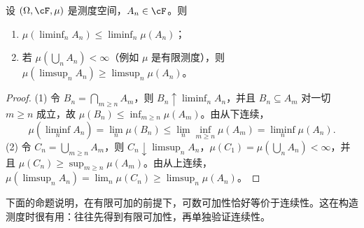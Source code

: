 \begin{proposition}\label{prop:measures:fatou-sets}
设 $(\Omega,\cF,\mu)$ 是测度空间，$A_n\in\cF$。则
\begin{enumerate}
\item $\mu(\liminf_nA_n)\leqslant\liminf_n\mu(A_n)$；
\item 若 $\mu(\bigcup_nA_n)<\infty$（例如 $\mu$ 是有限测度），则 $\mu(\limsup_nA_n)\geqslant\limsup_n\mu(A_n)$。
\end{enumerate}
\end{proposition}
\begin{proof}
(1) 令 $B_n=\bigcap_{m\geqslant n}A_m$，则 $B_n\uparrow\liminf_nA_n$，并且 $B_n\subseteq A_m$ 对一切 $m\geqslant n$ 成立，故 $\mu(B_n)\leqslant\inf_{m\geqslant n}\mu(A_m)$。由从下连续，
\[
\mu(\liminf_nA_n)=\lim_n\mu(B_n)\leqslant\lim_n\inf_{m\geqslant n}\mu(A_m)=\liminf_n\mu(A_n).
\]
(2) 令 $C_n=\bigcup_{m\geqslant n}A_m$，则 $C_n\downarrow\limsup_nA_n$，$\mu(C_1)=\mu(\bigcup_nA_n)<\infty$，并且 $\mu(C_n)\geqslant\sup_{m\geqslant n}\mu(A_m)$。由从上连续，$\mu(\limsup_nA_n)=\lim_n\mu(C_n)\geqslant\limsup_n\mu(A_n)$。
\end{proof}

下面的命题说明，在有限可加的前提下，可数可加性恰好等价于连续性。这在构造测度时很有用：往往先得到有限可加性，再单独验证连续性。

